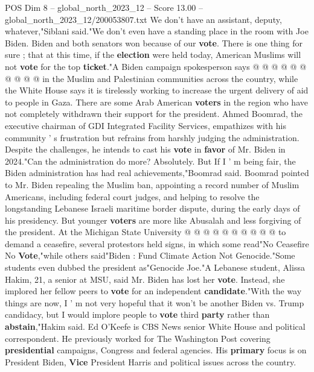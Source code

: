\begin{textsample}{POS Dim 8 – global\_north\_2023\_12 – Score 13.00 – global\_north\_2023\_12/200053807.txt}
We don't have an assistant, deputy, whatever,"Siblani said."We don't even have a standing place in the room with Joe Biden.
Biden and both senators won because of our \textbf{vote}.
There is one thing for sure ; that at this time, if the \textbf{election} were held today, American Muslims will not \textbf{vote} for the top \textbf{ticket}."A Biden campaign spokesperson says @ @ @ @ @ @ @ @ @ @ in the Muslim and Palestinian communities across the country, while the White House says it is tirelessly working to increase the urgent delivery of aid to people in Gaza.
There are some Arab American \textbf{voters} in the region who have not completely withdrawn their support for the president.
Ahmed Boomrad, the executive chairman of GDI Integrated Facility Services, empathizes with his community ' s frustration but refrains from harshly judging the administration.
Despite the challenges, he intends to cast his \textbf{vote} in \textbf{favor} of Mr.
Biden in 2024."Can the administration do more?
Absolutely.
But If I ' m being fair, the Biden administration has had real achievements,"Boomrad said.
Boomrad pointed to Mr.
Biden repealing the Muslim ban, appointing a record number of Muslim Americans, including federal court judges, and helping to resolve the longstanding Lebanese Israeli maritime border dispute, during the early days of his presidency.
But younger \textbf{voters} are more like Abusalah and less forgiving of the president.
At the Michigan State University @ @ @ @ @ @ @ @ @ @ to demand a ceasefire, several protestors held signs, in which some read"No Ceasefire No \textbf{Vote},"while others said"Biden : Fund Climate Action Not Genocide."Some students even dubbed the president as"Genocide Joe."A Lebanese student, Alissa Hakim, 21, a senior at MSU, said Mr.
Biden has lost her \textbf{vote}.
Instead, she implored her fellow peers to \textbf{vote} for an independent \textbf{candidate}."With the way things are now, I ' m not very hopeful that it won't be another Biden vs.
Trump candidacy, but I would implore people to \textbf{vote} third \textbf{party} rather than \textbf{abstain},"Hakim said.
Ed O'Keefe is CBS News senior White House and political correspondent.
He previously worked for The Washington Post covering \textbf{presidential} campaigns, Congress and federal agencies.
His \textbf{primary} focus is on President Biden, \textbf{Vice} President Harris and political issues across the country.

\end{textsample}
